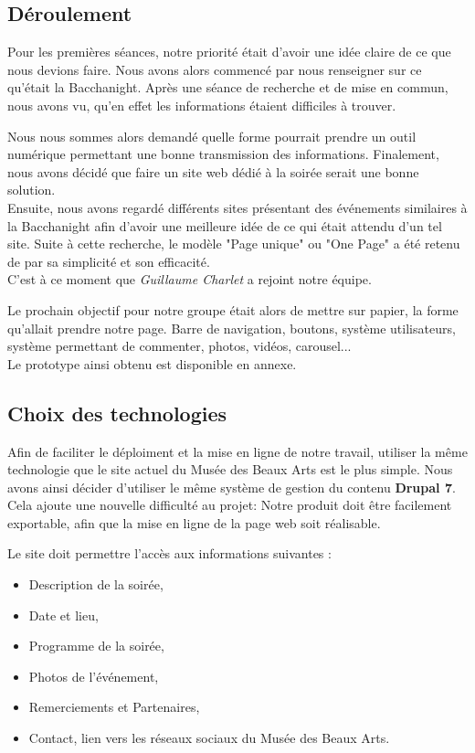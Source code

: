 \documentclass[11pt]{report}
\begin{document}
\subsection{Déroulement}

Pour les premières séances, notre priorité était d'avoir une idée claire
de ce que nous devions faire. Nous avons alors commencé par nous renseigner sur
ce qu'était la Bacchanight. Après une séance de recherche et de mise en commun,
nous avons vu, qu'en effet les informations étaient difficiles à trouver.
\par
Nous nous sommes alors demandé quelle forme pourrait prendre un outil numérique
permettant une bonne transmission des informations. Finalement, nous avons décidé
que faire un site web dédié à la soirée serait une bonne solution. \\
Ensuite, nous avons regardé différents sites présentant des événements similaires
à la Bacchanight afin d'avoir une meilleure idée de ce qui était attendu d'un
tel site. Suite à cette recherche, le modèle "Page unique" ou "One Page" a été
retenu de par sa simplicité et son efficacité. \\
C'est à ce moment que \textit{Guillaume Charlet} a rejoint notre équipe.
\par
Le prochain objectif pour notre groupe était alors de mettre sur papier,
la forme qu'allait prendre notre page. Barre de navigation, boutons,
système utilisateurs, système permettant de commenter, photos, vidéos, carousel... \\
Le prototype ainsi obtenu est disponible en annexe.

\newpage

\subsection{Choix des technologies}

Afin de faciliter le déploiment et la mise en ligne de notre travail, utiliser la
même technologie que le site actuel du Musée des Beaux Arts est le plus simple.
Nous avons ainsi décider d'utiliser le même système de gestion du contenu
\textbf{Drupal 7}. \\
Cela ajoute une nouvelle difficulté au projet: Notre produit doit être facilement
exportable, afin que la mise en ligne de la page web soit réalisable.

Le site doit permettre l'accès aux informations suivantes :
\begin{itemize}
	\item Description de la soirée,
	\item Date et lieu,
	\item Programme de la soirée,
	\item Photos de l'événement,
	\item Remerciements et Partenaires,
	\item Contact, lien vers les réseaux sociaux du Musée des Beaux Arts.
\end{itemize}
\end{document}
